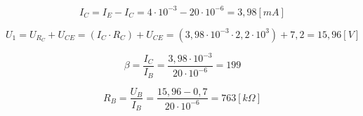 \vspace{0.5cm} %

\begin{solution}[name=Løsningsforslag oppgave]
\[I_C=I_E - I_C=4 \cdot 10^{-3} - 20 \cdot 10^{-6}= 3,98[mA]\]

\[U_1 = U_{R_C}+U_{CE} = (I_C \cdot R_C)+U_{CE}=(3,98 \cdot 10^{-3} \cdot 2,2 \cdot10^3) + 7,2 = 15,96 [V]\]

\[\beta=\frac{I_C}{I_B}=\frac{3,98 \cdot 10^{-3}}{20 \cdot 10^{-6}}=199\]

\[R_B=\frac{U_B}{I_B}= \frac{15,96-0,7}{20 \cdot 10^{-6}}=763 [k\Omega]\]


\end{solution}